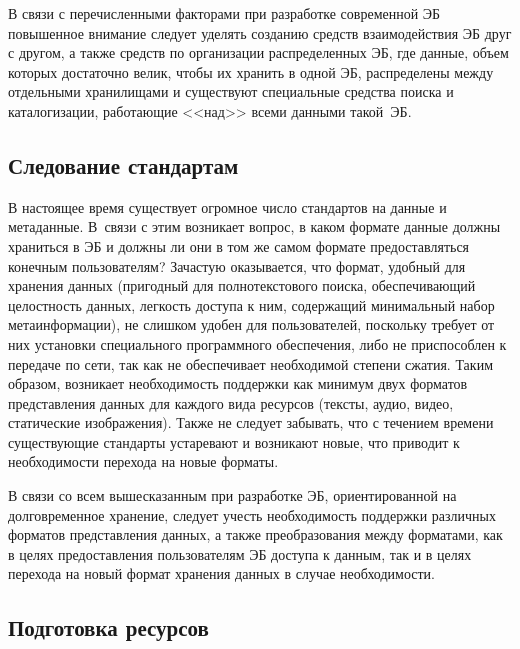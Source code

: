 \begin{multicols}{2}
  В связи с перечисленными факторами при разработке современной ЭБ повышенное 
внимание следует уделять созданию средств взаимодействия ЭБ друг с другом, а также 
средств по организации распределенных ЭБ, где данные, объем которых достаточно велик, 
чтобы их хранить в одной ЭБ, распределены между отдельными хранилищами и существуют 
специальные средства поиска и каталогизации, работающие <<над>> всеми данными та\-кой~ЭБ.

\vspace*{-6pt}
  
\subsection{Следование стандартам}
  
  В настоящее время существует огромное число стандартов на данные и метаданные. 
В~связи с этим возникает вопрос, в каком формате данные должны храниться в ЭБ и должны 
ли они в том же самом формате предоставляться конечным пользователям? Зачастую 
оказывается, что формат, удобный для хранения данных (пригодный для полнотекстового 
поиска, обеспечивающий целостность данных, легкость доступа к ним, содержащий 
минимальный набор метаинформации), не слишком удобен для пользователей, поскольку 
требует от них установки специального программного обеспечения, либо не приспособлен к 
передаче по сети, так как не обеспечивает необходимой степени сжатия. Таким образом, 
возникает необходимость поддержки как минимум двух форматов пред\-став\-ле\-ния данных 
для каждого вида ресурсов (тексты, аудио, видео, статические изображения). Также не 
следует забывать, что с течением времени существующие стандарты устаревают и 
возникают новые, что приводит к необходимости перехода на новые форматы.
  
  В связи со всем вышесказанным при разработке ЭБ, ориентированной на долговременное 
хранение, следует учесть необходимость поддержки различных форматов представления 
данных, а также преобразования между форматами, как в целях предо\-став\-ле\-ния 
пользователям ЭБ доступа к данным, так и в целях перехода на новый формат хранения 
данных в случае необходимости.

\vspace*{-6pt}

\subsection{Подготовка ресурсов}
  

\end{multicols}
